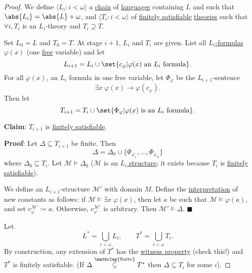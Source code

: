 \documentclass{article}
\let\models\vDash
\begin{document}
\begin{proof}
  We define $\langle L_i : i < \omega \rangle$ a \hyperlink{def:chain}{chain} of \hyperlink{def:lang}{languages} containing $L$ and such that $\abs{L_i} = \abs{L} + \omega$, and $\langle T_i : i < \omega \rangle$ of \hyperlink{def:fs}{finitely satisfiable} \hyperlink{def:ltheory}{theories} such that $\forall i, T_i$ is an $L_i$-theory and $T_i \supseteq T$.

  Set $L_0 = L$ and $T_0 = T$. At stage $i+1$, $L_i$ and $T_i$ are given.
  List all \hyperlink{def:form}{$L_i$-formulas} $\varphi(x)$ (one \hyperlink{def:free}{free} variable) and let
  \begin{equation*}L_{i+1} = L_i \cup \set{c_\varphi | \varphi(x) \text{ an } L_i \text{ formula}}.\end{equation*}
  For all $\varphi(x)$, an $L_i$ formula in one free variable, let $\Phi_\varphi$ be the $L_{i+1}$-sentence
  \begin{equation*}
    \exists x \; \varphi(x) \to \varphi(c_\varphi).
  \end{equation*}
  Then let
  \begin{equation*}T_{i+1} = T_i \cup \set{\Phi_\varphi | \varphi(x)\text{ is an }L_i\text{ formula}}.\end{equation*}

  \textbf{Claim}: $T_{i+1}$ is \hyperlink{def:fs}{finitely satisfiable}.

  \textbf{Proof}: Let $\Delta \subseteq T_{i+1}$ be finite.
  Then
  \begin{equation*}\Delta = \Delta_0 \cup \{\Phi_{\varphi_1}, \dotsc, \Phi_{\varphi_n}\}\end{equation*}
  where $\Delta_0 \subseteq T_i$.
  Let $\mathcal{M} \models \Delta_0$ ($\mathcal{M}$ is an \hyperlink{def:str}{$L_i$ structure}; it exists because $T_i$ is \hyperlink{def:fs}{finitely satisfiable}).

  We define an $L_{i+1}$-structure $\mathcal{M}'$ with domain $M$.
  Define the \hyperlink{def:str}{interpretation} of new constants as follows:
  if $\mathcal{M} \models \exists x \; \varphi(x)$, then let $a$ be such that $\mathcal{M} \models \varphi(a)$, and set $c_\varphi^{\mathcal{M}'} \coloneqq a$.
  Otherwise, $c_\varphi^{\mathcal{M}'}$ is arbitrary. Then $\mathcal{M}' \models \Delta$. $\blacksquare$

  Let
  \begin{equation*}L^* = \bigcup_{i < \omega} L_i, \qquad T^* = \bigcup_{i < \omega} T_i.\end{equation*}
  By construction, any extension of $T^*$ has the \hyperlink{def:wp}{witness property} (check this!) and $T^*$ is finitely satisfiable.
  (If $\Delta \overset{\mathclap{\text{finite}}}\subseteq T^*$ then $\Delta \subseteq T_i$ for some $i$).
\end{proof}
\end{document}

